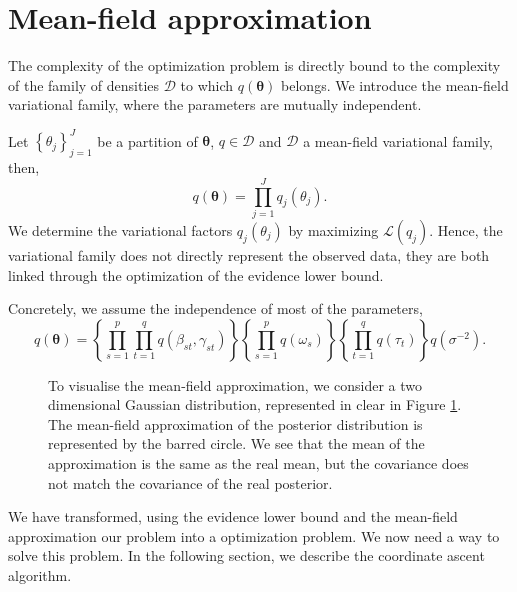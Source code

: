 \documentclass[a4paper, 11pt]{report}
\numberwithin{equation}{chapter}
\begin{document}
\section{Mean-field approximation}
The complexity of the optimization problem is directly bound to the complexity of the family of densities $\mathcal{D}$ to which $q(\boldsymbol{\theta})$ belongs. We introduce the mean-field variational family, where the parameters are mutually independent.

Let $\left\lbrace \theta_j\right\rbrace_{j=1}^J$ be a partition of $\boldsymbol{\theta}$, $q \in \mathcal{D}$ and $\mathcal{D}$ a mean-field variational family, then,
\begin{equation*}
q(\boldsymbol{\theta}) = \prod_{j=1}^J q_j(\theta_j).
\end{equation*}
We determine the variational factors $q_j(\theta_j)$ by maximizing $\mathcal{L}(q_j)$. Hence, the variational family does not directly represent the observed data, they are both linked through the optimization of the evidence lower bound.

Concretely, we assume the independence of most of the parameters,
\begin{equation*}
q(\boldsymbol{\theta}) =\left\lbrace\prod_{s=1}^p \prod_{t=1}^q q(\beta_{st}, \gamma_{st})\right\rbrace \left\lbrace\prod_{s=1}^p  q(\omega_s)\right\rbrace \left\lbrace\prod_{t=1}^q q(\tau_t)\right\rbrace q(\sigma^{-2}).
\end{equation*}


\begin{figure}[h!]
\centering
{}
\caption{\label{fig:mean_field}To visualise the mean-field approximation, we consider a two dimensional Gaussian distribution, represented in clear in Figure \ref{fig:mean_field}. The mean-field approximation of the posterior distribution is represented by the barred circle. We see that the mean of the approximation is the same as the real mean, but the covariance does not match the covariance of the real posterior.}
\end{figure}

We have transformed, using the evidence lower bound and the mean-field approximation our problem into a optimization problem. We now need a way to solve this problem. In the following section, we describe the coordinate ascent algorithm.
\end{document}
